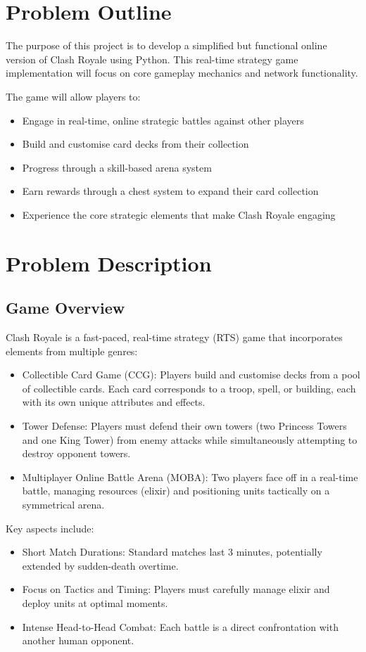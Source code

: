\documentclass{article}
\begin{document}
\section{Problem Outline}
The purpose of this project is to develop a simplified but functional online version of Clash Royale using Python. This real-time strategy game implementation will focus on core gameplay mechanics and network functionality.

\noindent The game will allow players to:
\begin{itemize}[label={--}]
    \item Engage in real-time, online strategic battles against other players
    \item Build and customise card decks from their collection
    \item Progress through a skill-based arena system
    \item Earn rewards through a chest system to expand their card collection
    \item Experience the core strategic elements that make Clash Royale engaging
\end{itemize}

\section{Problem Description}

\subsection{Game Overview}
Clash Royale is a fast-paced, real-time strategy (RTS) game that incorporates elements from multiple genres:
\begin{itemize}
    \item Collectible Card Game (CCG): Players build and customise decks from a pool of collectible cards. Each card corresponds to a troop, spell, or building, each with its own unique attributes and effects.
    \item Tower Defense: Players must defend their own towers (two Princess Towers and one King Tower) from enemy attacks while simultaneously attempting to destroy opponent towers.
    \item Multiplayer Online Battle Arena (MOBA): Two players face off in a real-time battle, managing resources (elixir) and positioning units tactically on a symmetrical arena.
\end{itemize}

\noindent Key aspects include:
\begin{itemize}
    \item Short Match Durations: Standard matches last 3 minutes, potentially extended by sudden-death overtime.
    \item Focus on Tactics and Timing: Players must carefully manage elixir and deploy units at optimal moments.
    \item Intense Head-to-Head Combat: Each battle is a direct confrontation with another human opponent.
\end{itemize}
\end{document}
